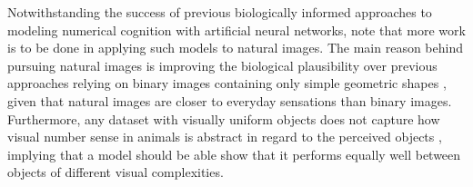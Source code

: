 \documentclass[twocolumn]{article}
\begin{document}
Notwithstanding the success of previous biologically informed approaches to modeling numerical cognition with artificial neural networks, \citet{stoianov2012} note that more work is to be done in applying such models to natural images. The main reason behind pursuing natural images is improving the biological plausibility over previous approaches relying on binary images containing only simple geometric shapes \citep[for examples, see][]{stoianov2012, wu2018two, peterson2000computational}, given that natural images are closer to everyday sensations than binary images. Furthermore, any dataset with visually uniform objects does not capture how visual number sense in animals is abstract in regard to the perceived objects \citep{nieder2016neuronal}, implying that a model should be able show that it performs equally well between objects of different visual complexities.
\end{document}
